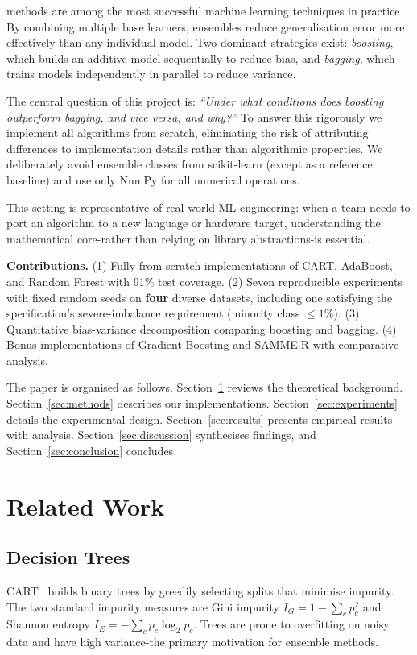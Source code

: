 \documentclass[conference]{IEEEtran}
\begin{document}
 methods are among the most successful
machine learning techniques in practice~\cite{hastie2009elements}.
By combining multiple base learners, ensembles reduce generalisation
error more effectively than any individual model.  Two dominant
strategies exist: \emph{boosting}, which builds an additive model
sequentially to reduce bias, and \emph{bagging}, which trains models
independently in parallel to reduce variance.

The central question of this project is: \textit{``Under what
conditions does boosting outperform bagging, and vice versa, and
why?''}  To answer this rigorously we implement all algorithms from
scratch, eliminating the risk of attributing differences to
implementation details rather than algorithmic properties.  We
deliberately avoid ensemble classes from scikit-learn (except as a
reference baseline) and use only NumPy for all numerical operations.

This setting is representative of real-world ML engineering: when
a team needs to port an algorithm to a new language or hardware target,
understanding the mathematical core-rather than relying on library
abstractions-is essential.

\textbf{Contributions.} (1) Fully from-scratch implementations of
CART, AdaBoost, and Random Forest with 91\% test coverage.
(2) Seven reproducible experiments with fixed random seeds on
\textbf{four} diverse datasets, including one satisfying the
specification's severe-imbalance requirement (minority class
$\le 1\%$). (3) Quantitative bias-variance decomposition
comparing boosting and bagging.  (4) Bonus implementations of
Gradient Boosting and SAMME.R with comparative analysis.

The paper is organised as follows.  Section~\ref{sec:related} reviews
the theoretical background.  Section~\ref{sec:methods} describes our
implementations.  Section~\ref{sec:experiments} details the
experimental design.  Section~\ref{sec:results} presents empirical
results with analysis.  Section~\ref{sec:discussion} synthesises
findings, and Section~\ref{sec:conclusion} concludes.

\section{Related Work}
\label{sec:related}

\subsection{Decision Trees}
CART~\cite{quinlan1986induction} builds binary trees by greedily
selecting splits that minimise impurity.  The two standard impurity
measures are Gini impurity $I_G = 1 - \sum_c p_c^2$ and Shannon
entropy $I_E = -\sum_c p_c \log_2 p_c$.  Trees are prone to
overfitting on noisy data and have high variance-the primary
motivation for ensemble methods.
\end{document}
